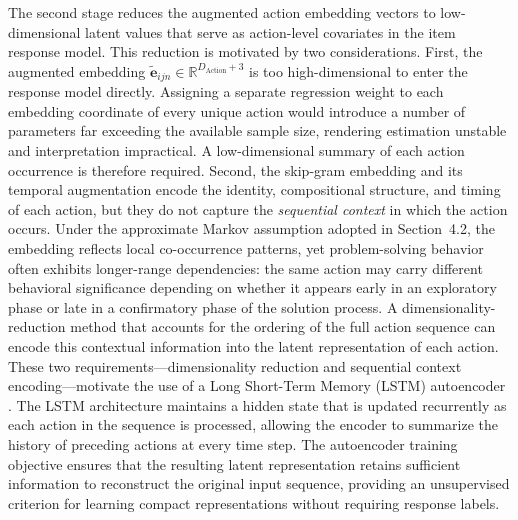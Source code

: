 \documentclass[A4paper,11pt]{article}
\begin{document}
The second stage reduces the augmented action embedding vectors to low-dimensional latent values that serve as action-level covariates in the item response model. This reduction is motivated by two considerations. First, the augmented embedding $\tilde{\mathbf{e}}_{ijn}\in\mathbb{R}^{D_{\mathrm{Action}}+3}$ is too high-dimensional to enter the response model directly. Assigning a separate regression weight to each embedding coordinate of every unique action would introduce a number of parameters far exceeding the available sample size, rendering estimation unstable and interpretation impractical. A low-dimensional summary of each action occurrence is therefore required. Second, the skip-gram embedding and its temporal augmentation encode the identity, compositional structure, and timing of each action, but they do not capture the \emph{sequential context} in which the action occurs. Under the approximate Markov assumption adopted in Section~4.2, the embedding reflects local co-occurrence patterns, yet problem-solving behavior often exhibits longer-range dependencies: the same action may carry different behavioral significance depending on whether it appears early in an exploratory phase or late in a confirmatory phase of the solution process. A dimensionality-reduction method that accounts for the ordering of the full action sequence can encode this contextual information into the latent representation of each action. These two requirements---dimensionality reduction and sequential context encoding---motivate the use of a Long Short-Term Memory (LSTM) autoencoder \citep{hochreiter1997long, srivastava2015unsupervised}. The LSTM architecture maintains a hidden state that is updated recurrently as each action in the sequence is processed, allowing the encoder to summarize the history of preceding actions at every time step. The autoencoder training objective ensures that the resulting latent representation retains sufficient information to reconstruct the original input sequence, providing an unsupervised criterion for learning compact representations without requiring response labels.
\end{document}
